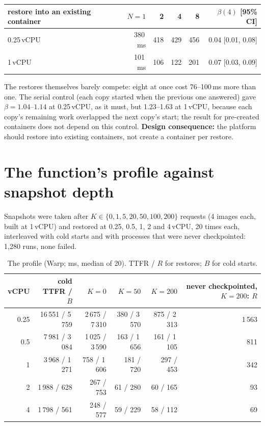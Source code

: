 \begin{center}
\small
\begin{tabular}{@{}lrrrrr@{}}
\toprule
restore into an existing container & $N = 1$ & 2 & 4 & 8 & $\beta(4)$ [95\% CI] \\
\midrule
0.25\,vCPU & 380\,ms & 418 & 429 & 456 & 0.04 [0.01, 0.08] \\
1\,vCPU & 101\,ms & 106 & 122 & 201 & 0.07 [0.03, 0.09] \\
\bottomrule
\end{tabular}
\end{center}

The restores themselves barely compete: eight at once cost 76--100\,ms more than one. The
serial control (each copy started when the previous one answered) gave $\beta = 1.04$--$1.14$ at
0.25\,vCPU, as it must, but 1.23--1.63 at 1\,vCPU, because each copy's remaining work overlapped
the next copy's start; the result for pre-created containers does not depend on this control.
\textbf{Design consequence:} the platform should restore into existing containers, not create a
container per restore.

\section{The function's profile against snapshot depth}
\label{sec:m-depth}

Snapshots were taken after $K \in \{0, 1, 5, 20, 50, 100, 200\}$ requests (4 images each, built at
1\,vCPU) and restored at 0.25, 0.5, 1, 2 and 4\,vCPU, 20 times each, interleaved with cold starts
and with processes that were never checkpointed: 1{,}280 runs, none failed.

\begin{table}[htbp]
\centering
\caption{The profile (Warp; ms, median of 20). TTFR / $R$ for restores; $B$ for cold starts.}
\label{tab:m-profile}
\small
\begin{tabular}{@{}rrrrrr@{}}
\toprule
vCPU & cold TTFR / $B$ & $K = 0$ & $K = 50$ & $K = 200$ & never checkpointed, $K = 200$: $R$ \\
\midrule
0.25 & 16\,551 / 5\,759 & 2\,675 / 7\,310 & 380 / 3\,570 & 875 / 2\,313 & 1\,563 \\
0.5 & 7\,981 / 3\,084 & 1\,025 / 3\,590 & 163 / 1\,656 & 161 / 1\,105 & 811 \\
1 & 3\,968 / 1\,271 & 758 / 1\,606 & 181 / 720 & 297 / 453 & 342 \\
2 & 1\,988 / 628 & 267 / 753 & 61 / 280 & 60 / 165 & 93 \\
4 & 1\,798 / 561 & 248 / 577 & 59 / 229 & 58 / 112 & 69 \\
\bottomrule
\end{tabular}
\end{table}

